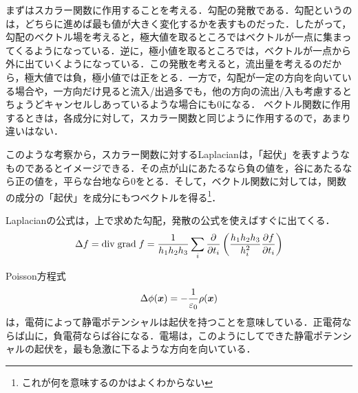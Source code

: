 \documentclass[a4paper,10pt,uplatex]{jsarticle}
\renewcommand{\div}{\mathrm{div}\;}
\renewcommand{\grad}{\mathrm{grad}\;}
\newcommand{\x}{\vb*{x}}
\begin{document}
まずはスカラー関数に作用することを考える．勾配の発散である．勾配というのは，どちらに進めば最も値が大きく変化するかを表すものだった．したがって，勾配のベクトル場を考えると，極大値を取るところではベクトルが一点に集まってくるようになっている．逆に，極小値を取るところでは，ベクトルが一点から外に出ていくようになっている．この発散を考えると，流出量を考えるのだから，極大値では負，極小値では正をとる．一方で，勾配が一定の方向を向いている場合や，一方向だけ見ると流入/出過多でも，他の方向の流出/入も考慮するとちょうどキャンセルしあっているような場合にも0になる．
ベクトル関数に作用するときは，各成分に対して，スカラー関数と同じように作用するので，あまり違いはない．

このような考察から，スカラー関数に対するLaplacianは，「起伏」を表すようなものであるとイメージできる．その点が山にあたるなら負の値を，谷にあたるなら正の値を，平らな台地なら0をとる．そして，ベクトル関数に対しては，関数の成分の「起伏」を成分にもつベクトルを得る\footnote{これが何を意味するのかはよくわからない}．

Laplacianの公式は，上で求めた勾配，発散の公式を使えばすぐに出てくる．
\begin{equation}
    \Delta f = \div \grad f = \frac{1}{h_1h_2h_3} \sum_i \pdv{t_i}\left(\frac{h_1h_2h_3}{h_i^2}\pdv{f}{t_i}\right)
\end{equation}

Poisson方程式
\begin{equation}
    \Delta \phi(\x) = -\frac{1}{\varepsilon_0}\rho(\x)
\end{equation}
は，電荷によって静電ポテンシャルは起伏を持つことを意味している．正電荷ならば山に，負電荷ならば谷になる．電場は，このようにしてできた静電ポテンシャルの起伏を，最も急激に下るような方向を向いている．
\end{document}

